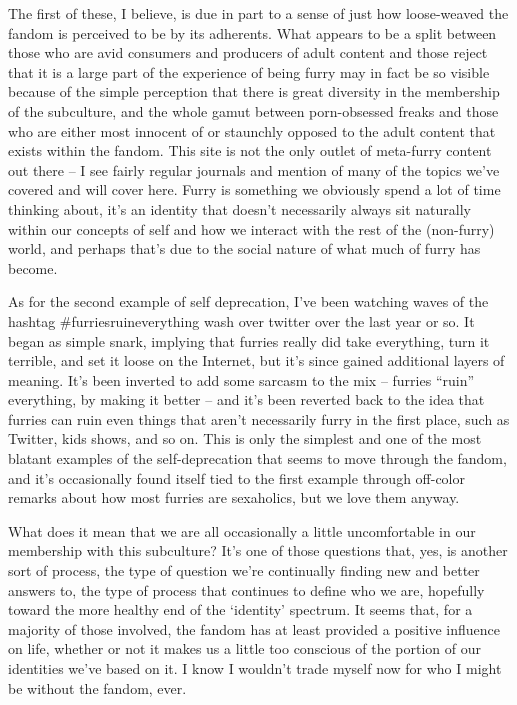 The first of these, I believe, is due in part to a sense of just how loose-weaved the fandom is  perceived to be by its adherents.  What appears to be a split between those who are avid consumers and producers of adult content and those reject that it is a large part of the  experience of being furry may in fact be so visible because of the simple perception that there is great diversity in the membership of the subculture, and the whole gamut between porn-obsessed freaks and those who are either most innocent of or staunchly opposed to the adult content that exists within the fandom.  This site is not the only outlet of meta-furry content out there -- I see fairly regular journals and mention of many of the topics we've covered and will cover here.  Furry is something we obviously spend a lot of time thinking about, it's an identity that doesn't necessarily always sit naturally within our concepts of self and how we interact with the rest of the (non-furry) world, and perhaps that's due to the social nature of what much of furry has become.

As for the second example of self deprecation, I've been watching waves of the hashtag \#furriesruineverything wash over twitter over the last year or so.  It began as simple snark, implying that furries really did take everything, turn it terrible, and set it loose on the Internet, but it's since gained additional layers of meaning.  It's been inverted to add some sarcasm to the mix -- furries ``ruin'' everything, by making it better -- and it's been reverted back to the idea that furries can ruin even things that aren't necessarily furry in the first place, such as Twitter, kids shows, and so on.  This is only the simplest and one of the most blatant examples of the self-deprecation that seems to move through the fandom, and it's occasionally found itself tied to the first example through off-color remarks about how most furries are sexaholics, but we love them anyway.

What does it mean that we are all occasionally a little uncomfortable in our membership with this subculture?  It's one of those questions that, yes, is another sort of process, the type of question we're continually finding new and better answers to, the type of process that continues to define who we are, hopefully toward the more healthy end of the `identity' spectrum.  It seems that, for a majority of those involved, the fandom has at least provided a positive influence on life, whether or not it makes us a little too conscious of the portion of our identities we've based on it.  I know I wouldn't trade myself now for who I might be without the fandom, ever.
